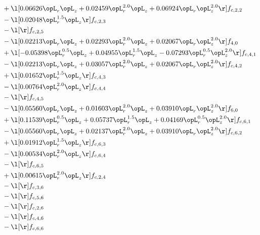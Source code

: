 \begin{alignat}{2}
& + \l[  0.06626 \opL_r \opL_z +  0.02459 \opL_r^{2.0} \opL_z +  0.06924 \opL_r \opL_z^{2.0}  \r] f_{c,2,2} \nonumber \\ 
& - \l[  0.02048 \opL_r^{1.5} \opL_z  \r] f_{c,2,3} \nonumber \\ 
& - \l[  \r] f_{c,2,5} \nonumber \\ 
& - \l[  0.02213 \opL_r \opL_z +  0.02293 \opL_r^{2.0} \opL_z +  0.02067 \opL_r \opL_z^{2.0}  \r] f_{4,0} \nonumber \\ 
& + \l[  -0.05398 \opL_r^{0.5} \opL_z +  0.04955 \opL_r^{1.5} \opL_z   -0.07293 \opL_r^{0.5} \opL_z^{2.0}  \r] f_{c,4,1} \nonumber \\ 
& - \l[  0.02213 \opL_r \opL_z +  0.03057 \opL_r^{2.0} \opL_z +  0.02067 \opL_r \opL_z^{2.0}  \r] f_{c,4,2} \nonumber \\ 
& + \l[  0.01652 \opL_r^{1.5} \opL_z  \r] f_{c,4,3} \nonumber \\ 
& - \l[  0.00764 \opL_r^{2.0} \opL_z  \r] f_{c,4,4} \nonumber \\ 
& - \l[  \r] f_{c,4,5} \nonumber \\ 
& - \l[  0.05560 \opL_r \opL_z +  0.01603 \opL_r^{2.0} \opL_z +  0.03910 \opL_r \opL_z^{2.0}  \r] f_{6,0} \nonumber \\ 
& + \l[  0.11539 \opL_r^{0.5} \opL_z +  0.05737 \opL_r^{1.5} \opL_z +  0.04169 \opL_r^{0.5} \opL_z^{2.0}  \r] f_{c,6,1} \nonumber \\ 
& - \l[  0.05560 \opL_r \opL_z +  0.02137 \opL_r^{2.0} \opL_z +  0.03910 \opL_r \opL_z^{2.0}  \r] f_{c,6,2} \nonumber \\ 
& + \l[  0.01912 \opL_r^{1.5} \opL_z  \r] f_{c,6,3} \nonumber \\ 
& - \l[  0.00534 \opL_r^{2.0} \opL_z  \r] f_{c,6,4} \nonumber \\ 
& - \l[  \r] f_{c,6,5} \nonumber \\ 
& + \l[  0.00615 \opL_r^{2.0} \opL_z  \r] f_{c,2,4} \nonumber \\ 
& - \l[  \r] f_{c,3,6} \nonumber \\ 
& - \l[  \r] f_{c,5,6} \nonumber \\ 
& - \l[  \r] f_{c,2,6} \nonumber \\ 
& - \l[  \r] f_{c,4,6} \nonumber \\ 
& - \l[  \r] f_{c,6,6} \nonumber \\ 
\end{alignat} 


